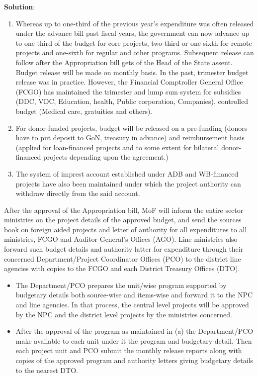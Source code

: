\documentclass[
]{book}
\newenvironment{solution}{ {\bfseries Solution}:}{}
\begin{document}
\begin{questions}
\begin{solution}
\begin{enumerate}
\item Whereas up to one-third of the previous year's expenditure was often released under the advance bill past fiscal years, the government can now advance up to one-third of the budget for core projects, two-third or one-sixth for remote projects and one-sixth for regular and other programs. Subsequent release can follow after the Appropriation bill gets of the Head of the State assent. Budget release will be made on monthly basis. In the past, trimester budget release was in practice. However, the Financial Comptroller General Office (FCGO) has maintained the trimester and lump sum system for subsidies (DDC, VDC, Education, health, Public corporation, Companies), controlled budget (Medical care, gratuities and others).
\item For donor-funded projects, budget will be released on a pre-funding (donors have to put deposit to GoN, treasury in advance) and reimbursement basis (applied for loan-financed projects and to some extent for bilateral donor-financed projects depending upon the agreement.)
\item The system of imprest account established under ADB and WB-financed projects have also been maintained under which the project authority can withdraw directly from the said account.
\end{enumerate}

After the approval of the Appropriation bill, MoF will inform the entire sector ministries on the project details of the approved budget, and send the sources book on foreign aided projects and letter of authority for all expenditures to all ministries, FCGO and Auditor General's Offices (AGO). Line ministries also forward such budget details and authority latter for expenditure through their concerned Department/Project Coordinator Offices (PCO) to the district line agencies with copies to the FCGO and each District Treasury Offices (DTO).

\begin{itemize}
\item The Department/PCO prepares the unit/wise program supported by budgetary details both source-wise and items-wise and forward it to the NPC and line agencies. In that process, the central level projects will be approved by the NPC and the district level projects by the ministries concerned.
\item After the approval of the program as maintained in (a) the Department/PCO make available to each unit under it the program and budgetary detail. Then each project unit and PCO submit the monthly release reports along with copies of the approved program and authority letters giving budgetary details to the nearest DTO.
\end{itemize}


\end{solution}
\end{questions}
\end{document}
